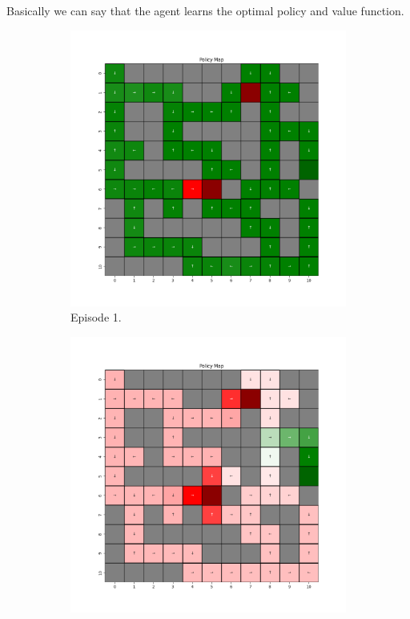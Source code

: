 \documentclass{assignment}
\begin{document}
Basically we can say that the agent learns the optimal policy and value function.

\begin{figure}[H]
    \begin{subfigure}{0.3\textwidth}
        \includegraphics[width=\textwidth]{figures/policy_td/default/policy_alpha_0.1_gamma_0.95_epsilon_0.2_iteration_1.png}
    \caption{Episode 1.}
    \end{subfigure}\hfill
    \begin{subfigure}{0.3\textwidth}
        \includegraphics[width=\textwidth]{figures/policy_td/default/policy_alpha_0.1_gamma_0.95_epsilon_0.2_iteration_50.png}

\end{subfigure}
\end{figure}
\end{document}
